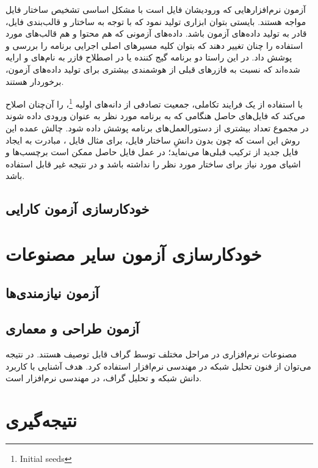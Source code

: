 \documentclass[a4paper,12pt]{article}
\begin{document}
آزمون نرم‌افزارهایی که ورودیشان فایل است با مشکل اساسی تشخیص ساختار فایل مواجه هستند. بایستی بتوان ابزاری تولید نمود که با توجه به ساختار و قالب‌بندی فایل، قادر به تولید داده‌های آزمون باشد. داده‌های آزمونی که هم محتوا و هم قالب‌های مورد استفاده را چنان تغییر دهند که بتوان کلیه مسیرهای اصلی اجرایی برنامه را بررسی و پوشش داد. در این راستا دو برنامه گیج کننده یا در اصطلاح فازر به نام‌های 
 \cite{Zalewsky2013}
و
 \cite{Godefroid:2017:LML:3155562.3155573}
ارایه شده‌اند که نسبت به فازرهای قبلی از هوشمندی بیشتری برای تولید داده‌های آزمون، برخوردار هستند.

 \cite{Zalewsky2013}
با استفاده از  یک فرایند تکاملی، جمعیت تصادفی از دانه‌های اولیه%
\footnote{Initial seeds}،
را آن‌چنان اصلاح می‌کند که فایل‌های حاصل هنگامی که به برنامه مورد نظر به عنوان ورودی داده شوند در مجموع تعداد بیشتری از دستورالعمل‌های برنامه پوشش داده شود. چالش عمده این روش این است که چون بدون دانشِ ساختار فایل‌، برای مثال فایل 
،
 مبادرت به ایجاد فایل جدید از ترکیب قبلی‌ها می‌نماید؛ در عمل فایل حاصل ممکن است برچسب‌ها و اشیای مورد نیاز برای ساختار مورد نظر را نداشته باشد و  در نتیجه غیر قابل استفاده باشد.

\subsection{
خودکارسازی آزمون کارایی
}

\section{
خودکارسازی آزمون سایر مصنوعات
}

\subsection{آزمون ‌نیازمندی‌ها}


\subsection{آزمون  طراحی و معماری}
مصنوعات نرم‌افزاری در مراحل مختلف توسط گراف‌ قابل توصیف هستند. در نتیجه می‌توان از فنون تحلیل شبکه در مهندسی نرم‌افزار استفاده کرد. هدف آشنایی با کاربرد دانش شبکه و تحلیل گراف، در مهندسی نرم‌افزار است. 


\section{
نتیجه‌گیری
}





\clearpage
\thispagestyle{plain}
\fancyhead[LO, RE]{\slshape }
\onehalfspacing

\end{document}
